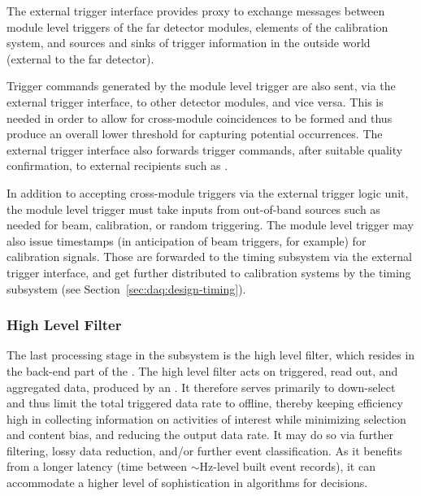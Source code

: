 The external trigger interface provides proxy to exchange messages between
module level triggers of the far detector modules, elements of the calibration
system, and sources and sinks of trigger information in the outside world
(external to the far detector).

Trigger commands generated by the module level trigger are also sent, via the
external trigger interface, to other detector modules, and vice versa.
This is needed in order to allow for cross-module coincidences to be formed and
thus produce an overall lower threshold for capturing potential 
occurrences. 
The external trigger interface also forwards  trigger commands, after
suitable quality confirmation, to external recipients such as .

In addition to accepting cross-module triggers via the external trigger logic
unit, the module level trigger must take inputs from out-of-band sources such as
needed for beam, calibration, or random triggering. 
The module level trigger may also issue timestamps (in anticipation of beam
triggers, for example) for calibration signals.
Those are forwarded to the timing subsystem via the external trigger interface,
and get further distributed to calibration systems by the timing subsystem (see
Section~\ref{sec:daq:design-timing}). 


\subsubsection{High Level Filter}
\label{sec:daq:design-data-reduction}

The last processing stage in the  subsystem is the
high level filter, which resides in the back-end part of the .
The high level filter acts on triggered, read out, and aggregated data,
produced by an . 
It therefore serves primarily to down-select and thus
limit the total triggered data rate to offline, thereby keeping %
efficiency high in collecting information on activities of interest
while minimizing selection and content bias, and reducing the output data
rate. It may do so via 
further filtering, lossy data reduction, and/or further event
classification. As it benefits from a longer latency (time between
$\sim$Hz-level built event records), it can accommodate a higher level of
sophistication in algorithms for  decisions.

